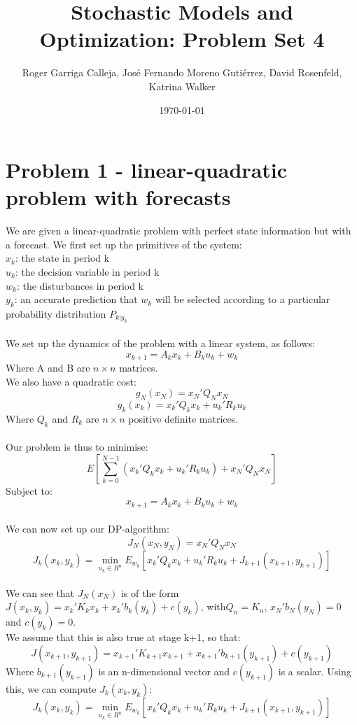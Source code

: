 \documentclass[11pt, english]{article}
\begin{document}
\title{Stochastic Models and Optimization: Problem Set 4}
\author{Roger Garriga Calleja, José Fernando Moreno Gutiérrez, David Rosenfeld, Katrina Walker}
\date{\today}
\maketitle
\section{Problem 1 - linear-quadratic problem with forecasts}

We are given a linear-quadratic problem with perfect state information but with a forecast. We first set up the primitives of the system:\\
$x_k$: the state in period k\\
$u_k$: the decision variable in period k\\
$w_k$: the disturbances in period k\\
$y_k$: an accurate prediction that $w_k$ will be selected according to a particular probability distribution $P_{k|y_k}$\\
\\
We set up the dynamics of the problem with a linear system, as follows:
$$x_{k+1} = A_kx_k + B_ku_k + w_k$$
Where A and B are $n \times n$ matrices.\\
We also have a quadratic cost:
$$g_N(x_N) = x_N'Q_Nx_N$$
$$g_k(x_k) = x_k'Q_kx_k + u_k'R_ku_k$$
Where $Q_k$ and $R_k$ are $n \times n$ positive definite matrices.\\
\\
Our problem is thus to minimise:
$$E[\sum_{k=0}^{N-1}(x_k'Q_kx_k + u_k'R_ku_k) + x_N'Q_Nx_N]$$
Subject to:
$$x_{k+1} = A_kx_k + B_ku_k + w_k$$
\\
We can now set up our DP-algorithm:
$$J_N(x_N, y_N) = x_N'Q_Nx_N$$
$$J_k(x_k, y_k) = \min_{u_k \in R^n}E_{w_k}[x_k'Q_kx_k + u_k'R_ku_k + J_{k+1}(x_{k+1}, y_{k+1})]$$
\\
We can see that $J_N(x_N)$ is of the form $J(x_k, y_k) = x_k'K_kx_k + x_k'b_k(y_k) + c(y_k)$, with$Q_n = K_n$, $x_N'b_N(y_N) = 0$ and $c(y_k) = 0$.\\
We assume that this is also true at stage k+1, so that:
$$J(x_{k+1}, y_{k+1}) = x_{k+1}'K_{k+1}x_{k+1} + x_{k+1}'b_{k+1}(y_{k+1}) + c(y_{k+1})$$
Where $b_{k+1}(y_{k+1})$ is an n-dimensional vector and $c(y_{k+1})$ is a scalar.
Using this, we can compute $J_k(x_k, y_k)$:
$$J_k(x_k, y_k) = \min_{u_k \in R^n}E_{w_k}[x_k'Q_kx_k + u_k'R_ku_k + J_{k+1}(x_{k+1}, y_{k+1})]$$
\end{document}
